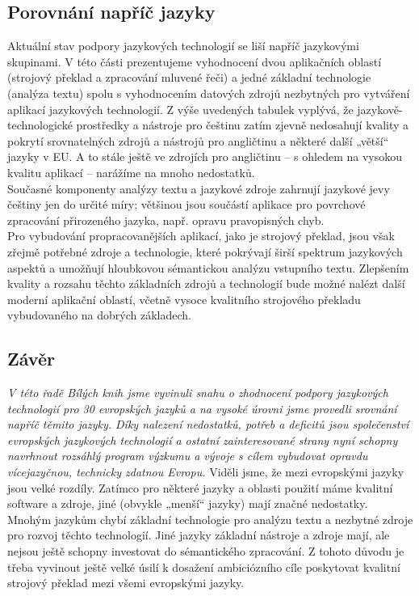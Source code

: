 \begin{multicols}{2}
\subsection{Porovnání napříč jazyky}

Aktuální stav podpory jazykových technologií se liší napříč jazykovými skupinami. V této části prezentujeme vyhodnocení dvou aplikačních oblastí (strojový překlad a zpracování mluvené řeči) a jedné základní technologie (analýza textu) spolu s vyhodnocením datových zdrojů nezbytných pro vytváření aplikací jazykových technologií. 
Z výše uvedených tabulek vyplývá, že jazykově-technologické prostředky a nástroje pro češtinu zatím zjevně nedosahují kvality a pokrytí srovnatelných zdrojů a nástrojů pro angličtinu a některé další „větší“ jazyky v EU. A to stále ještě ve zdrojích pro angličtinu – s ohledem na vysokou kvalitu aplikací – narážíme na mnoho nedostatků.\\ 
Současné komponenty analýzy textu a jazykové zdroje zahrnují jazykové jevy češtiny jen do určité míry; většinou jsou součástí aplikace pro povrchové zpracování přirozeného jazyka, např. opravu pravopisných chyb.\\
Pro vybudování propracovanějších aplikací, jako je strojový překlad, jsou však zřejmě potřebné zdroje a technologie, které pokrývají širší spektrum jazykových aspektů a umožňují hloubkovou sémantickou analýzu vstupního textu. Zlepšením kvality a rozsahu těchto základních zdrojů a technologií bude možné nalézt další moderní aplikační oblastí, včetně vysoce kvalitního strojového překladu vybudovaného na dobrých základech.

\subsection{Závěr}

\emph{V této řadě Bílých knih jsme vyvinuli snahu o zhodnocení podpory jazykových technologií pro 30 evropských jazyků a na vysoké úrovni jsme provedli srovnání napříč těmito jazyky. Díky nalezení nedostatků, potřeb a deficitů jsou společenství evropských jazykových technologií a ostatní zainteresované strany nyní schopny navrhnout rozsáhlý program výzkumu a vývoje s cílem vybudovat opravdu vícejazyčnou, technicky zdatnou Evropu.}
Viděli jsme, že mezi evropskými jazyky jsou velké rozdíly. Zatímco pro některé jazyky a oblasti použití máme kvalitní software a zdroje, jiné (obvykle „menší“ jazyky) mají značné nedostatky. Mnohým jazykům chybí základní technologie pro analýzu textu a nezbytné zdroje pro rozvoj těchto technologií. Jiné jazyky základní nástroje a zdroje mají, ale nejsou ještě schopny investovat do sémantického zpracování. Z tohoto důvodu je třeba vyvinout ještě velké úsilí k dosažení ambiciózního cíle poskytovat kvalitní strojový překlad mezi všemi evropskými jazyky. 


\end{multicols}
